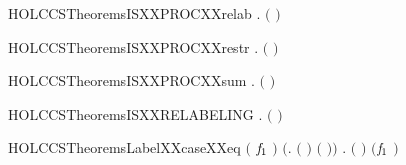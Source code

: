 \newcommand{\HOLCCSTheoremsISXXPROCXXprefix}{\UseVerbatim{HOLCCSTheoremsISXXPROCXXprefix}}
\begin{SaveVerbatim}{HOLCCSTheoremsISXXPROCXXrelab}
\HOLTokenTurnstile{} \HOLSymConst{\HOLTokenForall{}} .  \ensuremath{(}  \ensuremath{)} \HOLSymConst{\HOLTokenEquiv{}}  
\end{SaveVerbatim}
\newcommand{\HOLCCSTheoremsISXXPROCXXrelab}{\UseVerbatim{HOLCCSTheoremsISXXPROCXXrelab}}
\begin{SaveVerbatim}{HOLCCSTheoremsISXXPROCXXrestr}
\HOLTokenTurnstile{} \HOLSymConst{\HOLTokenForall{}} .  \ensuremath{(}  \ensuremath{)} \HOLSymConst{\HOLTokenEquiv{}}  
\end{SaveVerbatim}
\newcommand{\HOLCCSTheoremsISXXPROCXXrestr}{\UseVerbatim{HOLCCSTheoremsISXXPROCXXrestr}}
\begin{SaveVerbatim}{HOLCCSTheoremsISXXPROCXXsum}
\HOLTokenTurnstile{} \HOLSymConst{\HOLTokenForall{}} .  \ensuremath{(} \HOLSymConst{\ensuremath{+}} \ensuremath{)} \HOLSymConst{\HOLTokenEquiv{}}   \HOLSymConst{\HOLTokenConj{}}  
\end{SaveVerbatim}
\newcommand{\HOLCCSTheoremsISXXPROCXXsum}{\UseVerbatim{HOLCCSTheoremsISXXPROCXXsum}}
\begin{SaveVerbatim}{HOLCCSTheoremsISXXRELABELING}
\HOLTokenTurnstile{} \HOLSymConst{\HOLTokenForall{}}.  \ensuremath{(} \ensuremath{)}
\end{SaveVerbatim}
\newcommand{\HOLCCSTheoremsISXXRELABELING}{\UseVerbatim{HOLCCSTheoremsISXXRELABELING}}
\begin{SaveVerbatim}{HOLCCSTheoremsLabelXXcaseXXeq}
\HOLTokenTurnstile{} \ensuremath{(}   \ensuremath{\HOLFreeVar{f}\sb{\mathrm{1}}} \HOLSymConst{\ensuremath{=}} \ensuremath{)} \HOLSymConst{\HOLTokenEquiv{}}
   \ensuremath{(}\HOLSymConst{\HOLTokenExists{}}. \ensuremath{(} \HOLSymConst{\ensuremath{=}}  \ensuremath{)} \HOLSymConst{\HOLTokenConj{}} \ensuremath{(}  \HOLSymConst{\ensuremath{=}} \ensuremath{)}\ensuremath{)} \HOLSymConst{\HOLTokenDisj{}}
   \HOLSymConst{\HOLTokenExists{}}. \ensuremath{(} \HOLSymConst{\ensuremath{=}}  \ensuremath{)} \HOLSymConst{\HOLTokenConj{}} \ensuremath{(}\ensuremath{\HOLFreeVar{f}\sb{\mathrm{1}}}  \HOLSymConst{\ensuremath{=}} \ensuremath{)}
\end{SaveVerbatim}
